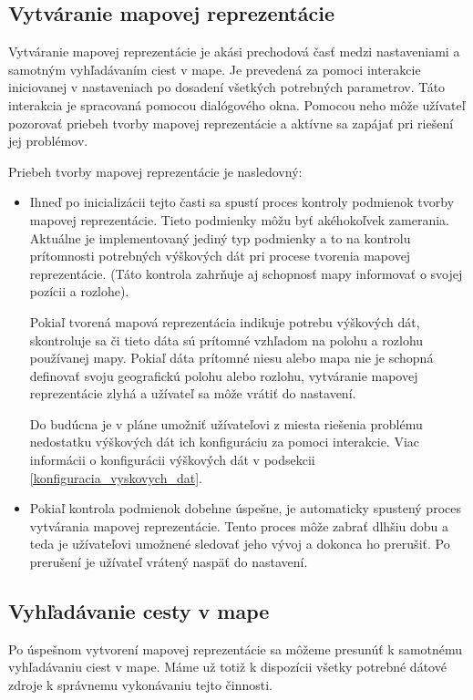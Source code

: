 \subsection{Vytváranie mapovej reprezentácie}

Vytváranie mapovej reprezentácie je akási prechodová časť medzi nastaveniami a samotným vyhľadávaním ciest v mape. Je prevedená za pomoci interakcie iniciovanej v nastaveniach po dosadení všetkých potrebných parametrov. Táto interakcia je spracovaná pomocou dialógového okna. Pomocou neho môže užívateľ pozorovať priebeh tvorby mapovej reprezentácie a aktívne sa zapájať pri riešení jej problémov.  

Priebeh tvorby mapovej reprezentácie je nasledovný:
\begin{itemize}
    \item Ihneď po inicializácii tejto časti sa spustí proces kontroly podmienok tvorby mapovej reprezentácie. Tieto podmienky môžu byť akéhokoľvek zamerania. Aktuálne je implementovaný jediný typ podmienky a to na kontrolu prítomnosti potrebných výškových dát pri procese tvorenia mapovej reprezentácie. (Táto kontrola zahrňuje aj schopnosť mapy informovať o svojej pozícii a rozlohe).
    
    Pokiaľ tvorená mapová reprezentácia indikuje potrebu výškových dát, skontroluje sa či tieto dáta sú prítomné vzhľadom na polohu a rozlohu používanej mapy. Pokiaľ dáta prítomné niesu alebo mapa nie je schopná definovať svoju geografickú polohu alebo rozlohu, vytváranie mapovej reprezentácie zlyhá a užívateľ sa môže vrátiť do nastavení. 
    
    Do budúcna je v pláne umožniť užívateľovi z miesta riešenia problému nedostatku výškových dát ich konfiguráciu za pomoci interakcie. Viac informácii o konfigurácii výškových dát v podsekcii \ref{konfiguracia_vyskovych_dat}.
    \item Pokiaľ kontrola podmienok dobehne úspešne, je automaticky spustený proces vytvárania mapovej reprezentácie. Tento proces môže zabrať dlhšiu dobu a teda je užívateľovi umožnené sledovať jeho vývoj a dokonca ho prerušiť. Po prerušení je užívateľ vrátený naspäť do nastavení.
\end{itemize}

\subsection{Vyhľadávanie cesty v mape}

Po úspešnom vytvorení mapovej reprezentácie sa môžeme presunúť k samotnému vyhľadávaniu ciest v mape. Máme už totiž k dispozícii všetky potrebné dátové zdroje k správnemu vykonávaniu tejto činnosti.


